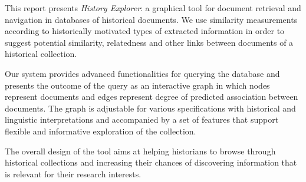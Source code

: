This report presents \emph{History Explorer}: a graphical tool for document retrieval and navigation in databases of historical documents. 
We use similarity measurements according to historically motivated types of extracted information in order to suggest potential similarity, relatedness and other links between documents of a historical collection.

Our system provides advanced functionalities for querying the database and presents the outcome of the query as an interactive graph in which nodes represent documents and edges represent degree of predicted association between documents. The graph is adjustable for various specifications with historical and linguistic interpretations and accompanied by a set of features that support flexible and informative exploration of the collection.

The overall design of the tool aims at helping historians to browse through historical collections and increasing their chances of discovering information that is relevant for their research interests. 



